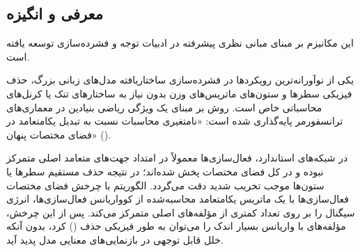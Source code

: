 \subsection{معرفی و انگیزه}
این مکانیزم بر مبنای مبانی نظری پیشرفته در ادبیات توجه و فشرده‌سازی \cite{ashkboos2024slicegpt} توسعه یافته است.

یکی از نوآورانه‌ترین رویکردها در فشرده‌سازی ساختاریافته مدل‌های زبانی بزرگ، حذف فیزیکی سطرها و ستون‌های ماتریس‌های وزن بدون نیاز به ساختارهای تنک یا کرنل‌های محاسباتی خاص است. روش  بر مبنای یک ویژگی ریاضی بنیادین در معماری‌های ترانسفورمر پایه‌گذاری شده است: «نامتغیری محاسبات نسبت به تبدیل یکامتعامد در فضای مختصات پنهان» ().

در شبکه‌های استاندارد، فعال‌سازی‌ها معمولاً در امتداد جهت‌های متعامد اصلی متمرکز نبوده و در کل فضای مختصات پخش شده‌اند؛ در نتیجه حذف مستقیم سطرها یا ستون‌ها موجب تخریب شدید دقت می‌گردد. الگوریتم  با چرخش فضای مختصات فعال‌سازی‌ها با یک ماتریس یکامتعامد محاسبه‌شده از کوواریانس فعال‌سازی‌ها، انرژی سیگنال را بر روی تعداد کمتری از مؤلفه‌های اصلی متمرکز می‌کند. پس از این چرخش، مؤلفه‌های با واریانس بسیار اندک را می‌توان به طور فیزیکی حذف () کرد، بدون آنکه خلل قابل توجهی در بازنمایی‌های معنایی مدل پدید آید.
